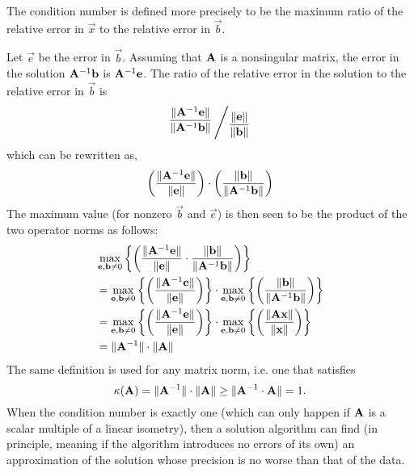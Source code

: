 The condition number is defined more precisely to be the maximum ratio of the
relative error in $\Vec{x}$ to the relative error in $\Vec{b}$.

Let $\Vec{e}$ be the error in $\Vec{b}$. Assuming that ${\mathbf{A}}$ is a
nonsingular matrix, the error in the solution ${\mathbf{A}}^{-1} {\mathbf{b}}$ is
${\mathbf{A}}^{-1} {\mathbf{e}}$. The ratio of the relative error in the solution to the
relative error in $\Vec{b}$ is
%
\begin{equation}
  \Bigslant{
    \dfrac{\Norm{\Mat{A}^{-1} \Vec{e}}}{\Norm{\Mat{A}^{-1} \Vec{b}}}
  }{
    \dfrac{\Norm{\Vec{e}}}{\Norm{\Vec{b}}}
  }
\end{equation}
%
which can be rewritten as,
%
\begin{equation}
  \left(
    \dfrac{{\|{\mathbf{A}}^{-1} {\mathbf{e}}\|}}{{\|{\mathbf{e}}\|}}
  \right)
  \cdot
  \left(
    \dfrac{{\|{\mathbf{b}}\|}}{{\|{\mathbf{A}}^{-1} {\mathbf{b}}\|}}
  \right)
\end{equation}
%
The maximum value (for nonzero $\Vec{b}$ and $\Vec{e}$) is then seen to be the
product of the two operator norms as follows:
%
\begin{align}
  &\max_{{\mathbf{e}}, {\mathbf{b}} \neq 0}
  \left\{
    \left(
      \dfrac{{\|{\mathbf{A}}^{-1} {\mathbf{e}}\|}}{{\|{\mathbf{e}}\|}}
      \cdot
      \dfrac{{\|{\mathbf{b}}\|}}{{\|{\mathbf{A}}^{-1} {\mathbf{b}}\|}}
    \right)
  \right\} \\
  &= \max_{{\mathbf{e}}, {\mathbf{b}} \neq 0}
  \left\{
    \left(
      \dfrac{{\|{\mathbf{A}}^{-1} {\mathbf{e}}\|}}{{\|{\mathbf{e}}\|}}
    \right)
  \right\}
  \cdot
  \max_{{\mathbf{e}}, {\mathbf{b}} \neq 0}
  \left\{
    \left(
      \dfrac{{\|{\mathbf{b}}\|}}{{\|{\mathbf{A}}^{-1} {\mathbf{b}}\|}}
    \right)
  \right\} \\
  &= \max_{{\mathbf{e}}, {\mathbf{b}} \neq 0}
  \left\{
    \left(
      \dfrac{{\|{\mathbf{A}}^{-1} {\mathbf{e}}\|}}{{\|{\mathbf{e}}\|}}
    \right)
  \right\}
  \cdot
  \max_{{\mathbf{e}}, {\mathbf{b}} \neq 0}
  \left\{
    \left(
      \dfrac{{\|{\mathbf{A}} {\mathbf{x}}\|}}{{\|{\mathbf{x}}\|}}
    \right)
  \right\} \\
  &= {\|{\mathbf{A}}^{-1}\|} \cdot {\|{\mathbf{A}}\|}
\end{align}
%
The same definition is used for any matrix norm, i.e. one that satisfies
%
\begin{equation}
  \kappa({\mathbf{A}}) = {\|{\mathbf{A}}^{-1}\|} \cdot {\|{\mathbf{A}}\|}
    \geq {\|{\mathbf{A}}^{-1} \cdot {\mathbf{A}}\|} = 1 .
\end{equation}
%
When the condition number is exactly one (which can only happen if ${\mathbf{A}}$ is
a scalar multiple of a linear isometry), then a solution algorithm can find (in
principle, meaning if the algorithm introduces no errors of its own) an
approximation of the solution whose precision is no worse than that of the
data.


